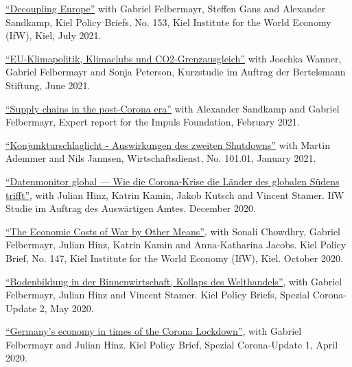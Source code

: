 \documentclass{article}
\begin{document}
\begin{minipage}[t]{0.8\textwidth}
    \href{https://www.ifw-kiel.de/publications/kiel-policy-briefs/2021/decoupling-europe-16271/}{``Decoupling Europe''} with Gabriel Felbermayr, Steffen Gans and Alexander Sandkamp, Kiel Policy Briefs, No. 153, Kiel Institute for the World Economy (IfW), Kiel, July 2021. \par
    \href{https://www.bertelsmann-stiftung.de/de/publikationen/publikation/did/eu-klimapolitik-klimaclubs-und-co2-grenzausgleich}{``EU-Klimapolitik, Klimaclubs und CO2-Grenzausgleich''} with Joschka Wanner, Gabriel Felbermayr and Sonja Peterson, Kurzstudie im Auftrag der Bertelsmann Stiftung, June 2021. \par
    \href{https://www.ifw-kiel.de/publications/policy-papers/2021/supply-chains-in-the-post-corona-era-in-german-15841/}{``Supply chains in the post-Corona era''} with Alexander Sandkamp and Gabriel Felbermayr, Expert report for the Impuls Foundation, February 2021. \par
\end{minipage}
\medskip

\begin{minipage}[t]{0.12\textwidth}
\hspace{0mm}
\end{minipage}
\hspace{5mm}
\begin{minipage}[t]{0.8\textwidth}
    \href{https://www.wirtschaftsdienst.eu/inhalt/jahr/2021/heft/1/beitrag/auswirkungen-des-zweiten-shutdowns.html}{``Konjunkturschlaglicht - Auswirkungen des zweiten Shutdowns''} with Martin Ademmer and Nils Jannsen, Wirtschaftsdienst, No. 101.01, January 2021. \par
    \href{https://www.ifw-kiel.de/de/publikationen/policy-papers/2021/corona-krise-datenmonitor-global-0/}{``Datenmonitor global — Wie die Corona-Krise die Länder des globalen Südens trifft''}, with Julian Hinz, Katrin Kamin, Jakob Kutsch and Vincent Stamer. IfW Studie im Auftrag des Auswärtigen Amtes. December 2020. \par
    \href{https://www.ifw-kiel.de/publications/kiel-policy-briefs/2020/the-economic-costs-of-war-by-other-means-15301/}{``The Economic Costs of War by Other Means''}, with Sonali Chowdhry, Gabriel Felbermayr, Julian Hinz, Katrin Kamin and Anna-Katharina Jacobs. Kiel Policy Brief, No. 147, Kiel Institute for the World Economy (IfW), Kiel. October 2020. \par
    \href{https://www.ifw-kiel.de/de/publikationen/kiel-policy-briefs/spezial/bodenbildung-in-der-binnenwirtschaft-kollaps-des-welthandels-14242/}{``Bodenbildung in der Binnenwirtschaft, Kollaps des Welthandels''}, with Gabriel Felbermayr, Julian Hinz and Vincent Stamer. Kiel Policy Briefs, Spezial Corona-Update 2, May 2020. \par
    \href{https://www.ifw-kiel.de/publications/kiel-policy-briefs/special-edition/germanys-economy-in-times-of-the-corona-lockdown-14127/}{``Germany’s economy in times of the Corona Lockdown''}, with Gabriel Felbermayr and Julian Hinz. Kiel Policy Brief, Spezial Corona-Update 1, April 2020.
\end{minipage}
\medskip
\end{document}
